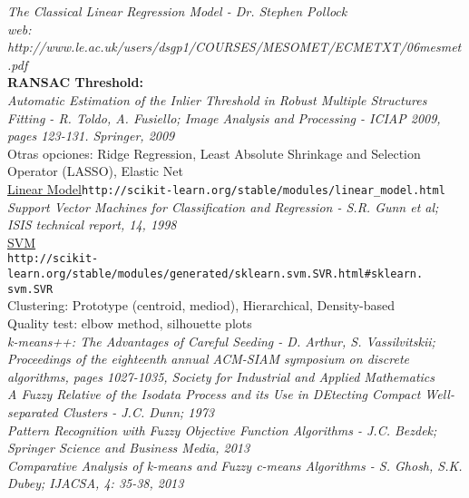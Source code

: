 \documentclass[12pt]{article}
\begin{document}
\textit{The Classical Linear Regression Model - Dr. Stephen Pollock\\
web: http://www.le.ac.uk/users/dsgp1/COURSES/MESOMET/ECMETXT/06mesmet.pdf}\\

\textbf{RANSAC Threshold:}\\
\textit{Automatic Estimation of the Inlier Threshold in Robust Multiple Structures Fitting - R. Toldo, A. Fusiello; Image Analysis and Processing - ICIAP 2009, pages 123-131. Springer, 2009}\\

Otras opciones: Ridge Regression, Least Absolute Shrinkage and Selection Operator (LASSO), Elastic Net\\

\href{http://scikit-learn.org/stable/modules/linear_model.html}{Linear Model}\verb+http://scikit-learn.org/stable/modules/linear_model.html+\\

\textit{Support Vector Machines for Classification and Regression - S.R. Gunn et al; ISIS technical report, 14, 1998}\\

\href{http://scikit-learn.org/stable/modules/generated/sklearn.svm.SVR.html#sklearn.svm.SVR}{SVM}\\ \verb+http://scikit-learn.org/stable/modules/generated/sklearn.svm.SVR.html#sklearn.+\\ \verb+svm.SVR+\\

Clustering: Prototype (centroid, mediod), Hierarchical, Density-based\\
Quality test: elbow method, silhouette plots\\

\textit{k-means++: The Advantages of Careful Seeding - D. Arthur, S. Vassilvitskii; Proceedings of the eighteenth annual ACM-SIAM symposium on discrete algorithms, pages 1027-1035, Society for Industrial and Applied Mathematics}\\

\textit{A Fuzzy Relative of the Isodata Process and its Use in DEtecting Compact Well-separated Clusters - J.C. Dunn; 1973}\\

\textit{Pattern Recognition with Fuzzy Objective Function Algorithms - J.C. Bezdek; Springer Science and Business Media, 2013}\\

\textit{Comparative Analysis of k-means and Fuzzy c-means Algorithms - S. Ghosh, S.K. Dubey; IJACSA, 4: 35-38, 2013}\\
\end{document}
